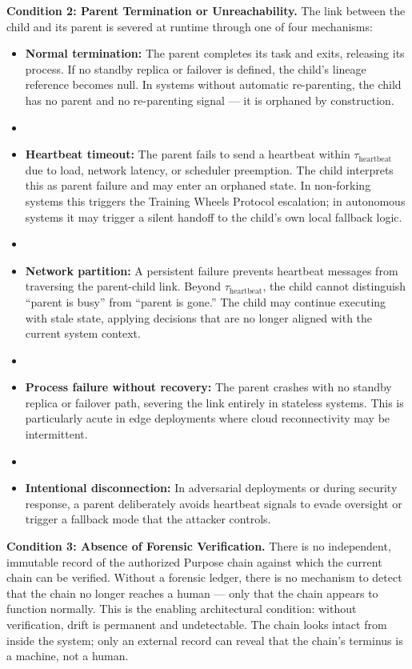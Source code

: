 \medskip
\noindent\textbf{Condition 2: Parent Termination or Unreachability.}
The link between the child and its parent is severed at runtime through one of four mechanisms:
\begin{itemize}
    \item \textbf{Normal termination:} The parent completes its task and exits, releasing its process. If no standby replica or failover is defined, the child's lineage reference becomes null. In systems without automatic re-parenting, the child has no parent and no re-parenting signal — it is orphaned by construction.
    \item \item \textbf{Heartbeat timeout:} The parent fails to send a heartbeat within $\tau_{\text{heartbeat}}$ due to load, network latency, or scheduler preemption. The child interprets this as parent failure and may enter an orphaned state. In non-forking systems this triggers the Training Wheels Protocol escalation; in autonomous systems it may trigger a silent handoff to the child's own local fallback logic.
    \item \item \textbf{Network partition:} A persistent failure prevents heartbeat messages from traversing the parent-child link. Beyond $\tau_{\text{heartbeat}}$, the child cannot distinguish ``parent is busy'' from ``parent is gone.'' The child may continue executing with stale state, applying decisions that are no longer aligned with the current system context.
    \item \item \textbf{Process failure without recovery:} The parent crashes with no standby replica or failover path, severing the link entirely in stateless systems. This is particularly acute in edge deployments where cloud reconnectivity may be intermittent.
    \item \item \textbf{Intentional disconnection:} In adversarial deployments or during security response, a parent deliberately avoids heartbeat signals to evade oversight or trigger a fallback mode that the attacker controls.
\end{itemize}

\medskip
\noindent\textbf{Condition 3: Absence of Forensic Verification.}
There is no independent, immutable record of the authorized Purpose chain against which the current chain can be verified. Without a forensic ledger, there is no mechanism to detect that the chain no longer reaches a human — only that the chain appears to function normally. This is the enabling architectural condition: without verification, drift is permanent and undetectable. The chain looks intact from inside the system; only an external record can reveal that the chain's terminus is a machine, not a human.


